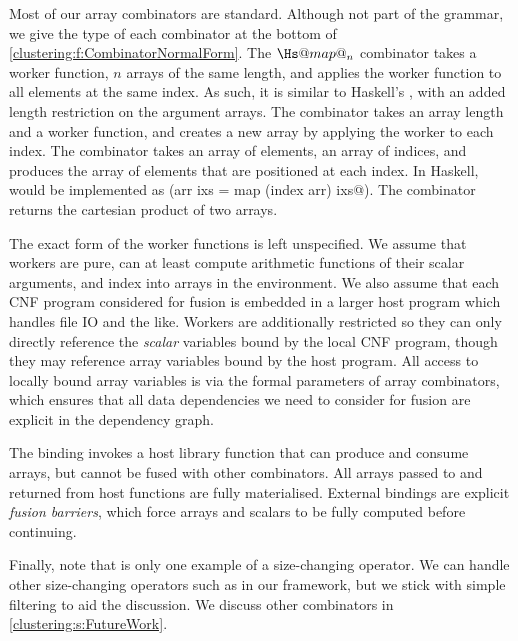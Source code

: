 Most of our array combinators are standard.
Although not part of the grammar, we give the type of each combinator at the bottom of \cref{clustering:f:CombinatorNormalForm}.
The $\Hs@map@_n$ combinator takes a worker function, $n$ arrays of the same length, and applies the worker function to all elements at the same index.
As such, it is similar to Haskell's \Hs@zipWith@, with an added length restriction on the argument arrays.
The \Hs@generate@ combinator takes an array length and a worker function, and creates a new array by applying the worker to each index.
The \Hs@gather@ combinator takes an array of elements, an array of indices, and produces the array of elements that are positioned at each index.
In Haskell, \Hs@gather@ would be implemented as (\Hs@gather arr ixs = map (index arr) ixs@).
The \Hs@cross@ combinator returns the cartesian product of two arrays. 

The exact form of the worker functions is left unspecified.
We assume that workers are pure, can at least compute arithmetic functions of their scalar arguments, and index into arrays in the environment.
We also assume that each CNF program considered for fusion is embedded in a larger host program which handles file IO and the like.
Workers are additionally restricted so they can only directly reference the \emph{scalar} variables bound by the local CNF program, though they may reference array variables bound by the host program.
All access to locally bound array variables is via the formal parameters of array combinators, which ensures that all data dependencies we need to consider for fusion are explicit in the dependency graph.

The \Hs@external@ binding invokes a host library function that can produce and consume arrays, but cannot be fused with other combinators.
All arrays passed to and returned from host functions are fully materialised.
External bindings are explicit \emph{fusion barriers}, which force arrays and scalars to be fully computed before continuing. 

Finally, note that \Hs@filter@ is only one example of a size-changing operator.
We can handle other size-changing operators such as \Hs@slice@ in our framework, but we stick with simple filtering to aid the discussion.
We discuss other combinators in \cref{clustering:s:FutureWork}.

